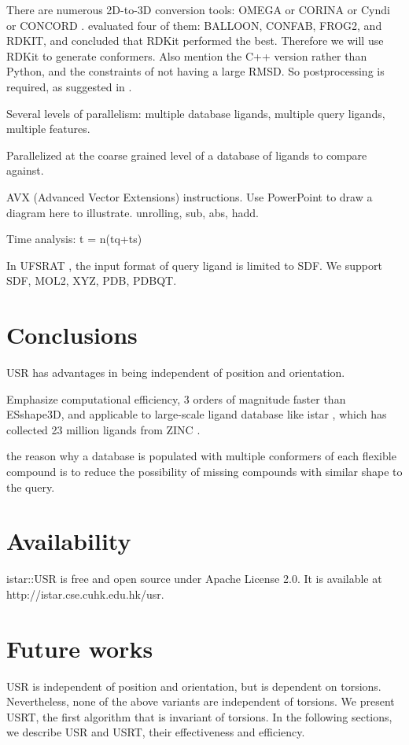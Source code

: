 There are numerous 2D-to-3D conversion tools: OMEGA \citep{462} or CORINA \citep{1392} or Cyndi \citep{1393,1394} or CONCORD \citep{}. \citep{1127} evaluated four of them: BALLOON, CONFAB, FROG2, and RDKIT, and concluded that RDKit performed the best. Therefore we will use RDKit to generate conformers. Also mention the C++ version rather than Python, and the constraints of not having a large RMSD. So postprocessing is required, as suggested in \citep{1127}.

Several levels of parallelism: multiple database ligands, multiple query ligands, multiple features.

Parallelized at the coarse grained level of a database of ligands to compare against.

AVX (Advanced Vector Extensions) instructions. Use PowerPoint to draw a diagram here to illustrate. unrolling, sub, abs, hadd.

Time analysis: t = n(tq+ts)

In UFSRAT \citep{1436}, the input format of query ligand is limited to SDF. We support SDF, MOL2, XYZ, PDB, PDBQT.

\section{Conclusions}

USR has advantages in being independent of position and orientation.

Emphasize computational efficiency, 3 orders of magnitude faster than ESshape3D, and applicable to large-scale ligand database like istar \citep{1362}, which has collected 23 million ligands from ZINC \citep{532,1178}.

the reason why a database is populated with multiple conformers of each flexible compound is to reduce the possibility of missing compounds with similar shape to the query.

\section{Availability}

istar::USR is free and open source under Apache License 2.0. It is available at http://istar.cse.cuhk.edu.hk/usr.

\section{Future works}

USR is independent of position and orientation, but is dependent on torsions. Nevertheless, none of the above variants are independent of torsions. We present USRT, the first algorithm that is invariant of torsions. In the following sections, we describe USR and USRT, their effectiveness and efficiency.

